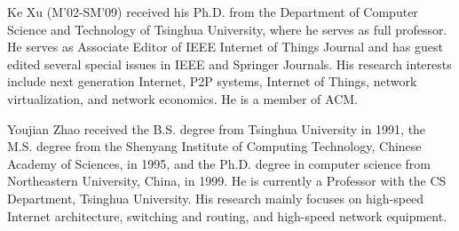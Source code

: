 \documentclass[10pt,journal,compsoc]{IEEEtran}
\begin{document}
\begin{IEEEbiography}{Ke Xu} (M'02-SM'09) received his Ph.D. from the Department of Computer Science and Technology of Tsinghua University, where he serves as full professor. He serves as Associate Editor of IEEE Internet of Things Journal and has guest edited several special issues in IEEE and Springer Journals. His research interests include next generation Internet, P2P systems, Internet of Things, network virtualization, and network economics. He is a member of ACM.
\end{IEEEbiography}

\begin{IEEEbiography}
{Youjian Zhao} received the B.S. degree from Tsinghua University in 1991, the M.S. degree from the Shenyang Institute of Computing Technology, Chinese Academy of Sciences, in 1995, and the Ph.D. degree in computer science from Northeastern University, China, in 1999. He is currently a Professor with the CS Department, Tsinghua University. His research mainly focuses on high-speed Internet architecture, switching and routing, and high-speed network equipment.
\end{IEEEbiography}

\end{document}
